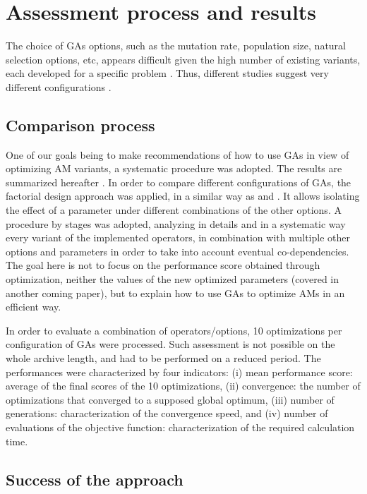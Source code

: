 \documentclass{ametsoc}
\begin{document}
\section{Assessment process and results}
\label{sec:assessment}

The choice of GAs options, such as the mutation rate, population size, natural selection options, etc, appears difficult given the high number of existing variants, each developed for a specific problem \citep{Haupt2004, Costa2007a}. Thus, different studies suggest very different configurations \citep{DeJong1975a, Grefenstette1986, Back1996a, Back1996b}.


\subsection{Comparison process}

One of our goals being to make recommendations of how to use GAs in view of optimizing AM variants, a systematic procedure was adopted. The results are summarized hereafter \citep[see][for the details]{Horton2012a}. In order to compare different configurations of GAs, the factorial design approach was applied, in a similar way as \citet{Costa2005a,Costa2007a} and \citet{Mariano2010a}. It allows isolating the effect of a parameter under different combinations of the other options. A procedure by stages was adopted, analyzing in details and in a systematic way every variant of the implemented operators, in combination with multiple other options and parameters in order to take into account eventual co-dependencies. The goal here is not to focus on the performance score obtained through optimization, neither the values of the new optimized parameters (covered in another coming paper), but to explain how to use GAs to optimize AMs in an efficient way.

In order to evaluate a combination of operators/options, 10 optimizations per configuration of GAs were processed. Such assessment is not possible on the whole archive length, and had to be performed on a reduced period. The performances were characterized by four indicators: (i) mean performance score: average of the final scores of the 10 optimizations, (ii) convergence: the number of optimizations that converged to a supposed global optimum, (iii) number of generations: characterization of the convergence speed, and (iv) number of evaluations of the objective function: characterization of the required calculation time.


\subsection{Success of the approach}
\end{document}
